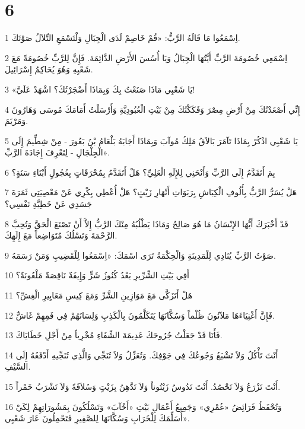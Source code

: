 \chapter{6}

\par 1 اِسْمَعُوا مَا قَالَهُ الرَّبُّ: «قُمْ خَاصِمْ لَدَى الْجِبَالِ وَلْتَسْمَعِ التِّلاَلُ صَوْتَكَ.
\par 2 اِسْمَعِي خُصُومَةَ الرَّبِّ أَيَّتُهَا الْجِبَالُ وَيَا أُسُسَ الأَرْضِ الدَّائِمَةَ. فَإِنَّ لِلرَّبِّ خُصُومَةً مَعَ شَعْبِهِ وَهُوَ يُحَاكِمُ إِسْرَائِيلَ.
\par 3 «يَا شَعْبِي مَاذَا صَنَعْتُ بِكَ وَبِمَاذَا أَضْجَرْتُكَ؟ اشْهَدْ عَلَيَّ!
\par 4 إِنِّي أَصْعَدْتُكَ مِنْ أَرْضِ مِصْرَ وَفَكَكْتُكَ مِنْ بَيْتِ الْعُبُودِيَّةِ وَأَرْسَلْتُ أَمَامَكَ مُوسَى وَهَارُونَ وَمَرْيَمَ.
\par 5 يَا شَعْبِي اذْكُرْ بِمَاذَا تَآمَرَ بَالاَقُ مَلِكُ مُوآبَ وَبِمَاذَا أَجَابَهُ بَلْعَامُ بْنُ بَعُورَ - مِنْ شِطِّيمَ إِلَى الْجِلْجَالِ - لِتَعْرِفَ إِجَادَةَ الرَّبِّ».
\par 6 بِمَ أَتَقَدَّمُ إِلَى الرَّبِّ وَأَنْحَنِي لِلإِلَهِ الْعَلِيِّ؟ هَلْ أَتَقَدَّمُ بِمُحْرَقَاتٍ بِعُجُولٍ أَبْنَاءِ سَنَةٍ؟
\par 7 هَلْ يُسَرُّ الرَّبُّ بِأُلُوفِ الْكِبَاشِ بِرَبَوَاتِ أَنْهَارِ زَيْتٍ؟ هَلْ أُعْطِي بِكْرِي عَنْ مَعْصِيَتِي ثَمَرَةَ جَسَدِي عَنْ خَطِيَّةِ نَفْسِي؟
\par 8 قَدْ أَخْبَرَكَ أَيُّهَا الإِنْسَانُ مَا هُوَ صَالِحٌ وَمَاذَا يَطْلُبُهُ مِنْكَ الرَّبُّ إِلاَّ أَنْ تَصْنَعَ الْحَقَّ وَتُحِبَّ الرَّحْمَةَ وَتَسْلُكَ مُتَوَاضِعاً مَعَ إِلَهِكَ.
\par 9 صَوْتُ الرَّبِّ يُنَادِي لِلْمَدِينَةِ وَالْحِكْمَةُ تَرَى اسْمَكَ: «اِسْمَعُوا لِلْقَضِيبِ وَمَنْ رَسَمَهُ.
\par 10 أَفِي بَيْتِ الشِّرِّيرِ بَعْدُ كُنُوزُ شَرٍّ وَإِيفَةٌ نَاقِصَةٌ مَلْعُونَةٌ؟
\par 11 هَلْ أَتَزَكَّى مَعَ مَوَازِينِ الشَّرِّ وَمَعَ كِيسِ مَعَايِيرِ الْغِشِّ؟
\par 12 فَإِنَّ أَغْنِيَاءَهَا مَلآنُونَ ظُلْماً وَسُكَّانَهَا يَتَكَلَّمُونَ بِالْكَذِبِ وَلِسَانَهُمْ فِي فَمِهِمْ غَاشٌّ.
\par 13 فَأَنَا قَدْ جَعَلْتُ جُرُوحَكَ عَدِيمَةَ الشِّفَاءِ مُخْرِباً مِنْ أَجْلِ خَطَايَاكَ.
\par 14 أَنْتَ تَأْكُلُ وَلاَ تَشْبَعُ وَجُوعُكَ فِي جَوْفِكَ. وَتُعَزِّلُ وَلاَ تُنَجِّي وَالَّذِي تُنَجِّيهِ أَدْفَعُهُ إِلَى السَّيْفِ.
\par 15 أَنْتَ تَزْرَعُ وَلاَ تَحْصُدُ. أَنْتَ تَدُوسُ زَيْتُوناً وَلاَ تَدَّهِنُ بِزَيْتٍ وَسُلاَفَةً وَلاَ تَشْرَبُ خَمْراً.
\par 16 وَتُحْفَظُ فَرَائِضُ «عُمْرِي» وَجَمِيعُ أَعْمَالِ بَيْتِ «أَخْآبَ» وَتَسْلُكُونَ بِمَشُورَاتِهِمْ لِكَيْ أُسَلِّمَكَ لِلْخَرَابِ وَسُكَّانَهَا لِلصَّفِيرِ فَتَحْمِلُونَ عَارَ شَعْبِي».

